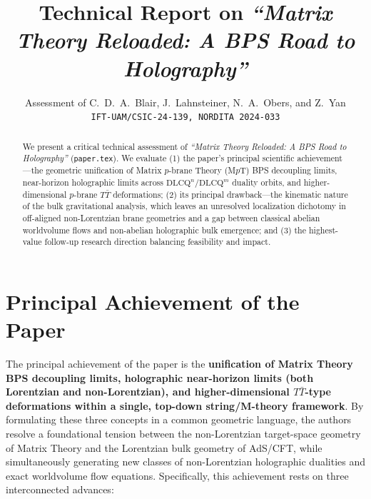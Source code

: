 \documentclass[11pt,a4paper]{article}
\title{\textbf{Technical Report on \emph{``Matrix Theory Reloaded: A BPS Road to Holography''}}}
\author{Assessment of C.~D.~A.~Blair, J.~Lahnsteiner, N.~A.~Obers, and Z.~Yan\\
\small \texttt{IFT-UAM/CSIC-24-139, NORDITA 2024-033}}
\date{}
\begin{document}
\maketitle

\vspace{-1.5em}
\begin{abstract}
\noindent
We present a critical technical assessment of \emph{``Matrix Theory Reloaded: A BPS Road to Holography''} (\texttt{paper.tex}). We evaluate (1) the paper's principal scientific achievement---the geometric unification of Matrix $p$-brane Theory (M$p$T) BPS decoupling limits, near-horizon holographic limits across $\text{DLCQ}^n/\text{DLCQ}^m$ duality orbits, and higher-dimensional $p$-brane $T\bar{T}$ deformations; (2) its principal drawback---the kinematic nature of the bulk gravitational analysis, which leaves an unresolved localization dichotomy in off-aligned non-Lorentzian brane geometries and a gap between classical abelian worldvolume flows and non-abelian holographic bulk emergence; and (3) the highest-value follow-up research direction balancing feasibility and impact.
\end{abstract}

\section{Principal Achievement of the Paper}

The principal achievement of the paper is the \textbf{unification of Matrix Theory BPS decoupling limits, holographic near-horizon limits (both Lorentzian and non-Lorentzian), and higher-dimensional $T\bar{T}$-type deformations within a single, top-down string/M-theory framework}. By formulating these three concepts in a common geometric language, the authors resolve a foundational tension between the non-Lorentzian target-space geometry of Matrix Theory and the Lorentzian bulk geometry of AdS/CFT, while simultaneously generating new classes of non-Lorentzian holographic dualities and exact worldvolume flow equations. Specifically, this achievement rests on three interconnected advances:
\end{document}

